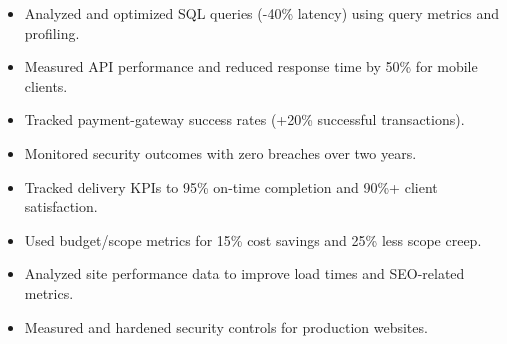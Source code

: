 \begin{itemize}
\item Analyzed and optimized SQL queries (-40\% latency) using query metrics and profiling.
\item Measured API performance and reduced response time by 50\% for mobile clients.
\item Tracked payment-gateway success rates (+20\% successful transactions).
\item Monitored security outcomes with zero breaches over two years.
\end{itemize}
\divider

\begin{itemize}
\item Tracked delivery KPIs to 95\% on-time completion and 90\%+ client satisfaction.
\item Used budget/scope metrics for 15\% cost savings and 25\% less scope creep.
\end{itemize}
\divider

\begin{itemize}
\item Analyzed site performance data to improve load times and SEO-related metrics.
\item Measured and hardened security controls for production websites.
\end{itemize}

\newpage
\switchcolumn
